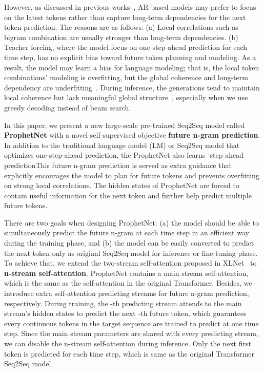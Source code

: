 \documentclass[11pt,a4paper]{article}
\begin{document}
However, as discussed in previous works~\cite{pascanu2013difficulty,gulcehre2017plan,serdyuk2017twin}, AR-based models may prefer to focus on the latest tokens rather than capture long-term dependencies for the next token prediction. The reasons are as follows: (a) Local correlations such as bigram combination are usually stronger than long-term dependencies.
(b) Teacher forcing, where the model focus on one-step-ahead prediction for each time step, has no explicit bias toward future token planning and modeling. As a result, the model may learn a bias for language modeling; that is, the local token combinations' modeling is overfitting, but the global coherence and long-term dependency are underfitting~\cite{krueger2016zoneout,merity2017regularizing,serdyuk2017twin}.
During inference, the generations tend to maintain local coherence but lack meaningful global structure~\cite{li2017learning, serdyuk2017twin}, especially when we use greedy decoding instead of beam search.



In this paper, we present a new large-scale pre-trained Seq2Seq model called \textbf{ProphetNet} with a novel self-supervised objective \textbf{future n-gram prediction}.
In addition to the traditional language model (LM) or Seq2Seq model that optimizes one-step-ahead prediction, the ProphetNet also learns -step ahead predictionThis future n-gram prediction is served as extra guidance that explicitly encourages the model to plan for future tokens and prevents overfitting on strong local correlations.
The hidden states of ProphetNet are forced to contain useful information for the next token and further help predict multiple future tokens.

There are two goals when designing ProphetNet: (a) the model should be able to simultaneously predict the future n-gram at each time step in an efficient way during the training phase, and (b) the model can be easily converted to predict the next token only as original Seq2Seq model for inference or fine-tuning phase.
To achieve that, we extend the two-stream self-attention proposed in XLNet~\cite{yang2019xlnet} to \textbf{n-stream self-attention}.
ProphetNet contains a main stream self-attention, which is the same as the self-attention in the original Transformer. 
Besides, we introduce  extra self-attention predicting streams for future n-gram prediction, respectively. 
During training, the -th predicting stream attends to the main stream's hidden states to predict the next -th future token, which guarantees every  continuous tokens in the target sequence are trained to predict at one time step.
Since the main stream parameters are shared with every predicting stream, we can disable the n-stream self-attention during inference. Only the next first token is predicted for each time step, which is same as the original Transformer Seq2Seq model.
\end{document}
